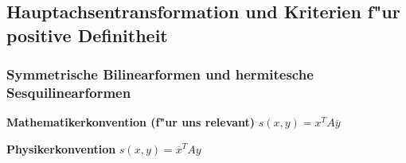 \documentclass[9pt, a4paper, twocolumn, landscape]{article}
\begin{document}
\subsection{Hauptachsentransformation und Kriterien f"ur positive Definitheit}

\subsubsection{Symmetrische Bilinearformen und hermitesche Sesquilinearformen}


\begin{remark}


\textbf{Mathematikerkonvention (f"ur uns relevant)} $s(x, y) = x^T A \overline{y}$

\textbf{Physikerkonvention} $s(x, y) = \overline{x}^T A y$

\end{remark}
\end{document}

